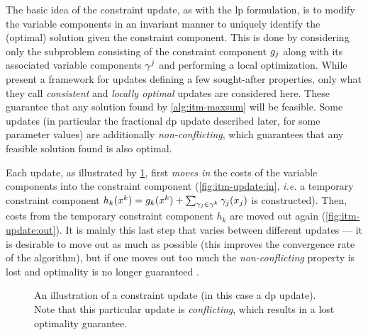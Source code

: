 The basic idea of the constraint update, as with the \gls{lp} formulation, is to modify the variable components in an invariant manner to uniquely identify the (optimal) solution given the constraint component.
This is done by considering only the subproblem consisting of the constraint component \(g_j\) along with its associated variable components \(\gamma^j\) and performing a local optimization.
While \textcite[\pno~100\psq]{Wedelin08} present a framework for updates defining a few sought-after properties, only what they call \emph{consistent} and \emph{locally optimal} updates are considered here.
These guarantee that any solution found by \cref{alg:itm-maxsum} will be feasible.
Some updates (in particular the fractional \acrshort{dp} update described later, for some parameter values) are additionally \emph{non-conflicting}, which guarantees that any feasible solution found is also optimal.

Each update, as illustrated by \cref{fig:itm-update}, first \emph{moves in} the costs of the variable components into the constraint component (\cref{fig:itm-update:in}, \emph{i.e.} a temporary constraint component \(h_k(x^k) = g_k(x^k) + \sum_{\gamma_j \in \gamma^k} \gamma_j(x_j)\) is constructed).
Then, costs from the temporary constraint component \(h_k\) are moved out again (\cref{fig:itm-update:out}).
It is mainly this last step that varies between different updates --- it is desirable to move out as much as possible (this improves the convergence rate of the algorithm), but if one moves out too much the \emph{non-conflicting} property is lost and optimality is no longer guaranteed \parencites[\pno~105]{Wedelin08}[\pno~15]{Wedelin13}.

\begin{figure}[t]
	\centering
	\hfil
	\hfil
	\caption{An illustration of a constraint update (in this case a \gls{dp} update). Note that this particular update is \emph{conflicting}, which results in a lost optimality guarantee.}
	\label{fig:itm-update}
\end{figure}

